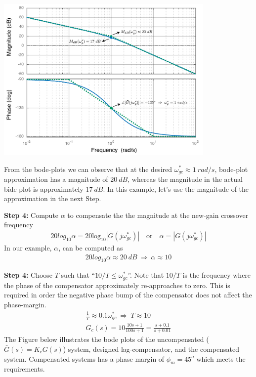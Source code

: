 \documentclass[twoside]{article}
\begin{document}
     \begin{center}
 \begin{minipage}[h]{\linewidth}
     \begin{center}
       \includegraphics[width=0.8\textwidth]{laggaincross}
     \end{center}
 \end{minipage}
     \end{center}
     
From the bode-plots we can observe that 
at the desired  $\omega_{gc}^* \approx 1 \ rad/s$,
bode-plot approximation has a magnitude of
$20 \ dB$, whereas the magnitude in the actual
bide plot is approximately $17 \ dB$. In this example,
let's use the magnitude of the approximation in the
next Step.

\textbf{Step 4:} Compute $\alpha$ to compensate the 
the magnitude at the new-gain crossover frequency
%
\begin{align*} 
  20 log_{10} \alpha =  20 \mathrm{log}_{10} |\bar{G}(j  \omega_{gc}^*) |
  	\quad \mathrm{or} \quad
     \alpha = | \bar{G}(j  \omega_{gc}^*) |
\end{align*}
%
In our example, $\alpha$, can be computed as
%
\begin{align*} 
	20 log_{10} \alpha \approx 20 \ dB
	\ \Rightarrow \ \alpha \approx 10
\end{align*}
%

\textbf{Step 4:} Choose $T$ such that ``$10/T \leq \omega_{gc}^*$''.
Note that $10/T$ is the frequency where the phase of the compensator
approximately re-approaches to zero.
This is required in order the
          negative phase bump of the compensator does not affect the
          phase-margin. 
%
\begin{align*} 
	\frac{1}{T} \approx 0.1 \omega_{gc}^*
		\ \Rightarrow \ T \approx 10
		\\	
G_c(s) = 10 \frac{10 s + 1}{100 s + 1} = \frac{s + 0.1}{s + 0.01}
\end{align*}
%
The Figure below illustrates the bode plots of 
the uncompensated ($\bar{G}(s) = K_c G(s)$) system,
designed lag-compensator, and the compensated system. 
Compensated systems has a phase margin of $\phi_m = 45^o$
which meets the requirements.
\end{document}
